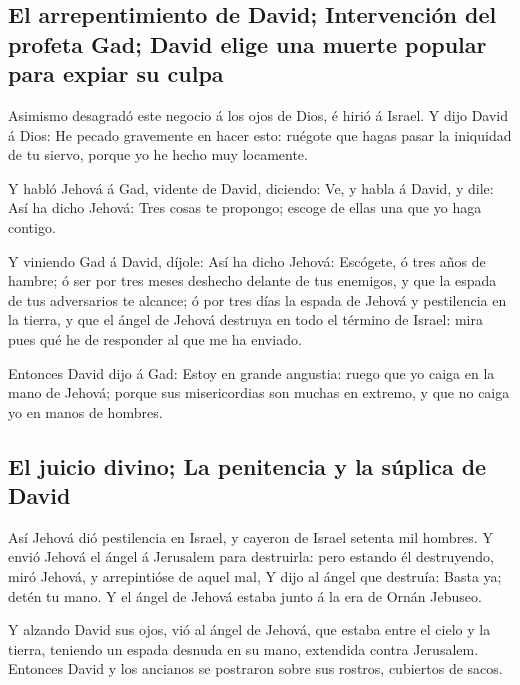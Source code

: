\hypertarget{el-arrepentimiento-de-david-intervenciuxf3n-del-profeta-gad-david-elige-una-muerte-popular-para-expiar-su-culpa}{%
\subsection{El arrepentimiento de David; Intervención del profeta Gad;
David elige una muerte popular para expiar su
culpa}\label{el-arrepentimiento-de-david-intervenciuxf3n-del-profeta-gad-david-elige-una-muerte-popular-para-expiar-su-culpa}}

 Asimismo desagradó este negocio á los ojos de Dios, é hirió
á Israel.  Y dijo David á Dios: He pecado gravemente en
hacer esto: ruégote que hagas pasar la iniquidad de tu siervo, porque yo
he hecho muy locamente.

 Y habló Jehová á Gad, vidente de David, diciendo:
 Ve, y habla á David, y dile: Así ha dicho Jehová: Tres
cosas te propongo; escoge de ellas una que yo haga contigo.

 Y viniendo Gad á David, díjole: Así ha dicho Jehová:
 Escógete, ó tres años de hambre; ó ser por tres meses
deshecho delante de tus enemigos, y que la espada de tus adversarios te
alcance; ó por tres días la espada de Jehová y pestilencia en la tierra,
y que el ángel de Jehová destruya en todo el término de Israel: mira
pues qué he de responder al que me ha enviado.

 Entonces David dijo á Gad: Estoy en grande angustia: ruego
que yo caiga en la mano de Jehová; porque sus misericordias son muchas
en extremo, y que no caiga yo en manos de hombres.

\hypertarget{el-juicio-divino-la-penitencia-y-la-suxfaplica-de-david}{%
\subsection{El juicio divino; La penitencia y la súplica de
David}\label{el-juicio-divino-la-penitencia-y-la-suxfaplica-de-david}}

 Así Jehová dió pestilencia en Israel, y cayeron de Israel
setenta mil hombres.  Y envió Jehová el ángel á Jerusalem
para destruirla: pero estando él destruyendo, miró Jehová, y
arrepintióse de aquel mal,  Y dijo al ángel que destruía:
Basta ya; detén tu mano. Y el ángel de Jehová estaba junto á la era de
Ornán Jebuseo.

 Y alzando David sus ojos, vió al ángel de Jehová, que
estaba entre el cielo y la tierra, teniendo un espada desnuda en su
mano, extendida contra Jerusalem. Entonces David y los ancianos se
postraron sobre sus rostros, cubiertos de sacos.

